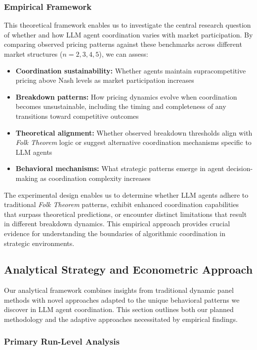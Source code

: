 \subsubsection*{Empirical Framework}

This theoretical framework enables us to investigate the central research question of whether and how LLM agent coordination varies with market participation. By comparing observed pricing patterns against these benchmarks across different market structures ($n = 2, 3, 4, 5$), we can assess:
\begin{itemize}[noitemsep]
    \item \textbf{Coordination sustainability:} Whether agents maintain supracompetitive pricing above Nash levels as market participation increases
    \item \textbf{Breakdown patterns:} How pricing dynamics evolve when coordination becomes unsustainable, including the timing and completeness of any transitions toward competitive outcomes  
    \item \textbf{Theoretical alignment:} Whether observed breakdown thresholds align with \emph{Folk Theorem} logic or suggest alternative coordination mechanisms specific to LLM agents
    \item \textbf{Behavioral mechanisms:} What strategic patterns emerge in agent decision-making as coordination complexity increases
\end{itemize}

The experimental design enables us to determine whether LLM agents adhere to traditional \emph{Folk Theorem} patterns, exhibit enhanced coordination capabilities that surpass theoretical predictions, or encounter distinct limitations that result in different breakdown dynamics. This empirical approach provides crucial evidence for understanding the boundaries of algorithmic coordination in strategic environments.

\subsection{Analytical Strategy and Econometric Approach}

Our analytical framework combines insights from traditional dynamic panel methods with novel approaches adapted to the unique behavioral patterns we discover in LLM agent coordination. This section outlines both our planned methodology and the adaptive approaches necessitated by empirical findings.

\subsubsection*{Primary Run-Level Analysis}

